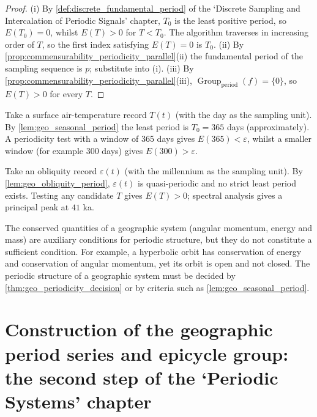 \begin{proof}
(i) By \cref{def:discrete_fundamental_period} of the `Discrete Sampling and Intercalation of Periodic Signals' chapter, $T_0$ is the least positive period, so $E(T_0)=0$, whilst $E(T)>0$ for $T<T_0$. The algorithm traverses in increasing order of $T$, so the first index satisfying $E(T)=0$ is $T_0$.
(ii) By \cref{prop:commensurability_periodicity_parallel}(ii) the fundamental period of the sampling sequence is $p$; substitute into (i).
(iii) By \cref{prop:commensurability_periodicity_parallel}(iii), $\operatorname{Group}_{\mathrm{period}}(f)=\{0\}$, so $E(T)>0$ for every $T$.
\end{proof}

\begin{example}\label{ex:geo_seasonal_period}
Take a surface air-temperature record $T(t)$ (with the day as the sampling unit). By \cref{lem:geo_seasonal_period} the least period is $T_0=365$ days (approximately). A periodicity test with a window of 365 days gives $E(365)<\varepsilon$, whilst a smaller window (for example 300 days) gives $E(300)>\varepsilon$.
\end{example}

\begin{example}\label{ex:geo_milankovitch_quasi}
Take an obliquity record $\varepsilon(t)$ (with the millennium as the sampling unit). By \cref{lem:geo_obliquity_period}, $\varepsilon(t)$ is quasi-periodic and no strict least period exists. Testing any candidate $T$ gives $E(T)>0$; spectral analysis gives a principal peak at $41$ ka.
\end{example}

\begin{remark}\label{rem:geo_invariant_not_period}
The conserved quantities of a geographic system (angular momentum, energy and mass) are auxiliary conditions for periodic structure, but they do not constitute a sufficient condition. For example, a hyperbolic orbit has conservation of energy and conservation of angular momentum, yet its orbit is open and not closed. The periodic structure of a geographic system must be decided by \cref{thm:geo_periodicity_decision} or by criteria such as \cref{lem:geo_seasonal_period}.
\end{remark}

\section{Construction of the geographic period series and epicycle group: the second step of the `Periodic Systems' chapter}
\label{sec:geo_series_construction}

